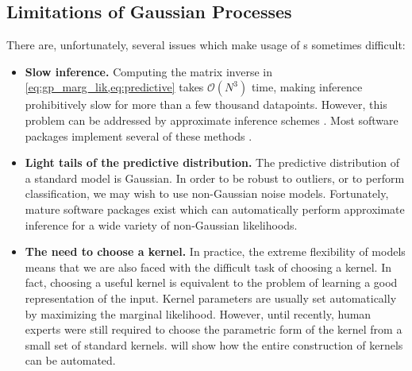 \subsection{Limitations of Gaussian Processes}

There are, unfortunately, several issues which make usage of \gp{}s sometimes difficult:

\begin{itemize}

\item {\bf Slow inference.}
Computing the matrix inverse in \cref{eq:gp_marg_lik,eq:predictive} takes $\mathcal{O}(N^3)$ time, making inference prohibitively slow for more than a few thousand datapoints.
However, this problem can be addressed by approximate inference schemes \citep{snelson2006sparse, quinonero2005unifying, hensman2013gaussian}. 
Most \gp{} software packages implement several of these methods \citep{GPy, GPML, VanRiiHarJylVeh14}.

\item {\bf Light tails of the predictive distribution.}
The predictive distribution of a standard \gp{} model is Gaussian.
In order to be robust to outliers, or to perform classification, we may wish to use non-Gaussian noise models.
Fortunately, mature software packages exist which can automatically perform approximate inference for a wide variety of non-Gaussian likelihoods.

\item {\bf The need to choose a kernel.}
In practice, the extreme flexibility of \gp{} models means that we are also faced with the difficult task of choosing a kernel.
In fact, 
choosing a useful kernel is equivalent to the problem of learning a good representation of the input.
Kernel parameters are usually set automatically by maximizing the marginal likelihood.
However, until recently, human experts were still required to choose the parametric form of the kernel from a small set of standard kernels.
 will show how the entire construction of kernels can be automated.
\end{itemize}





